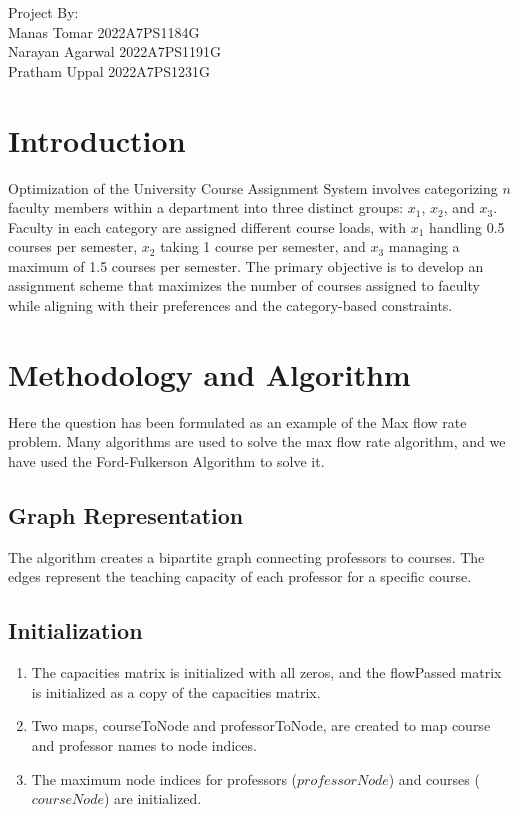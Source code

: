 \documentclass{article}
\begin{document}
Project By:
\\Manas Tomar      2022A7PS1184G
\\Narayan Agarwal  2022A7PS1191G
\\Pratham Uppal    2022A7PS1231G

\section*{Introduction}
Optimization of the University Course Assignment System involves categorizing \(n\) faculty members within a department into three distinct groups: \(x_1\), \(x_2\), and \(x_3\). Faculty in each category are assigned different course loads, with \(x_1\) handling 0.5 courses per semester, \(x_2\) taking 1 course per semester, and \(x_3\) managing a maximum of 1.5 courses per semester. The primary objective is to develop an assignment scheme that maximizes the number of courses assigned to faculty while aligning with their preferences and the category-based constraints.

\section*{Methodology and Algorithm}

Here the question has been formulated as an example of the Max flow rate problem. Many algorithms are used to solve the max flow rate algorithm, and we have used the Ford-Fulkerson Algorithm to solve it.

\subsection*{Graph Representation}
The algorithm creates a bipartite graph connecting professors to courses. The edges represent the teaching capacity of each professor for a specific course.

\subsection*{Initialization}
\begin{enumerate}
    \item The capacities matrix is initialized with all zeros, and the flowPassed matrix is initialized as a copy of the capacities matrix.
    \item Two maps, courseToNode and professorToNode, are created to map course and professor names to node indices.
    \item The maximum node indices for professors (\(professorNode\)) and courses (\(courseNode\)) are initialized.
\end{enumerate}
\end{document}
